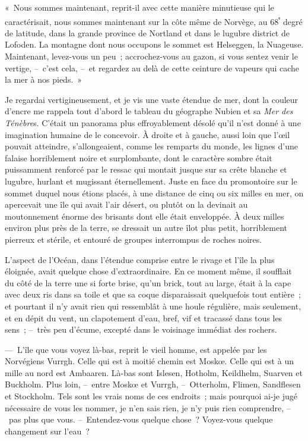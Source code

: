 \documentclass[french,twoside]{book} %
\begin{document}
« Nous sommes maintenant, reprit-il avec cette manière minutieuse qui le caractérisait, nous sommes maintenant sur la côte même de Norvège, au 68\textsuperscript{ᵉ} degré de latitude, dans la grande province de Nortland et dans le lugubre district de Lofoden. La montagne dont nous occupons le sommet est Helseggen, la Nuageuse. Maintenant, levez-vous un peu ; accrochez-vous au gazon, si vous sentez venir le vertige, – c’est cela, – et regardez au delà de cette ceinture de vapeurs qui cache la mer à nos pieds. »\par
Je regardai vertigineusement, et je vis une vaste étendue de mer, dont la couleur d’encre me rappela tout d’abord le tableau du géographe Nubien et sa \emph{Mer des Ténèbre}s. C’était un panorama plus effroyablement désolé qu’il n’est donné à une imagination humaine de le concevoir. À droite et à gauche, aussi loin que l’œil pouvait atteindre, s’allongeaient, comme les remparts du monde, les lignes d’une falaise horriblement noire et surplombante, dont le caractère sombre était puissamment renforcé par le ressac qui montait jusque sur sa crête blanche et lugubre, hurlant et mugissant éternellement. Juste en face du promontoire sur le sommet duquel nous étions placés, à une distance de cinq ou six milles en mer, on apercevait une île qui avait l’air désert, ou plutôt on la devinait au moutonnement énorme des brisants dont elle était enveloppée. À deux milles environ plus près de la terre, se dressait un autre îlot plus petit, horriblement pierreux et stérile, et entouré de groupes interrompus de roches noires.\par
L’aspect de l’Océan, dans l’étendue comprise entre le rivage et l’île la plus éloignée, avait quelque chose d’extraordinaire. En ce moment même, il soufflait du côté de la terre une si forte brise, qu’un brick, tout au large, était à la cape avec deux ris dans sa toile et que sa coque disparaissait quelquefois tout entière ; et pourtant il n’y avait rien qui ressemblât à une houle régulière, mais seulement, et en dépit du vent, un clapotement d’eau, bref, vif et tracassé dans tous les sens ; – très peu d’écume, excepté dans le voisinage immédiat des rochers.\par
— L’île que vous voyez là-bas, reprit le vieil homme, est appelée par les Norvégiens Vurrgh. Celle qui est à moitié chemin est Moskœ. Celle qui est à un mille au nord est Ambaaren. Là-bas sont Islesen, Hotholm, Keildhelm, Suarven et Buckholm. Plus loin, – entre Moskœ et Vurrgh, – Otterholm, Flimen, Sandflesen et Stockholm. Tels sont les vrais noms de ces endroits ; mais pourquoi ai-je jugé nécessaire de vous les nommer, je n’en sais rien, je n’y puis rien comprendre, – pas plus que vous. – Entendez-vous quelque chose ? Voyez-vous quelque changement sur l’eau ?\par
\end{document}
